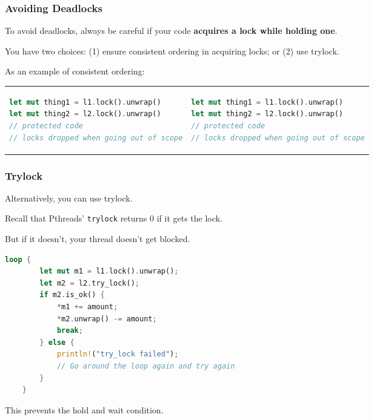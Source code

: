 \begin{frame}[fragile]
\frametitle{Avoiding Deadlocks}

To avoid deadlocks, always be careful if your code {\bf acquires a lock while holding one}.  
  
You have two choices: (1) ensure consistent ordering in acquiring locks; or (2) use trylock.

As an example of consistent ordering:
\begin{center}
\begin{tabular}{ll}
\begin{minipage}{.4\textwidth}
  \begin{lstlisting}[language=Rust]
let mut thing1 = l1.lock().unwrap()
let mut thing2 = l2.lock().unwrap()
// protected code
// locks dropped when going out of scope
\end{lstlisting}
\end{minipage}&
\begin{minipage}{.4\textwidth}
\begin{lstlisting}[language=Rust]
let mut thing1 = l1.lock().unwrap()
let mut thing2 = l2.lock().unwrap()
// protected code
// locks dropped when going out of scope
  \end{lstlisting}
\end{minipage}
\end{tabular}
\end{center}

\end{frame}



\begin{frame}[fragile]
\frametitle{Trylock}

Alternatively, you can use trylock. 

Recall that Pthreads' {\tt trylock} returns 0 if it gets the lock. 

But if it doesn't, your thread doesn't get blocked. 

  \begin{lstlisting}[language=Rust]
    loop {
        let mut m1 = l1.lock().unwrap();
        let m2 = l2.try_lock();
        if m2.is_ok() {
            *m1 += amount;
            *m2.unwrap() -= amount;
            break;
        } else {
            println!("try_lock failed");
            // Go around the loop again and try again
        }
    }
  \end{lstlisting}
  
This prevents the hold and wait condition.

\end{frame}



